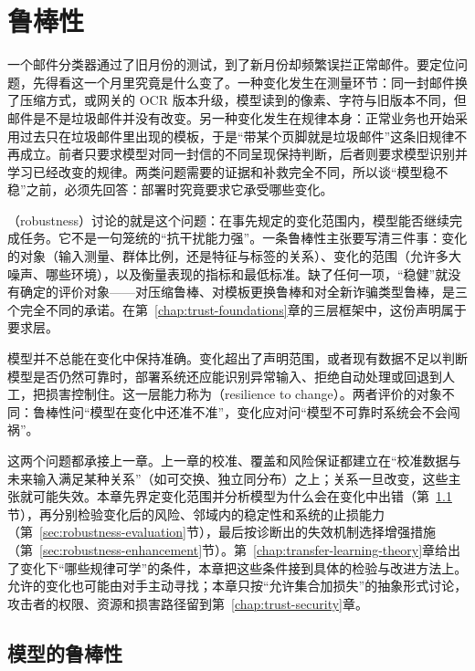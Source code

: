 \chapter{鲁棒性}
\label{chap:trust-robustness}

一个邮件分类器通过了旧月份的测试，到了新月份却频繁误拦正常邮件。要定位问题，先得看这一个月里究竟是什么变了。一种变化发生在测量环节：同一封邮件换了压缩方式，或网关的 OCR 版本升级，模型读到的像素、字符与旧版本不同，但邮件是不是垃圾邮件并没有改变。另一种变化发生在规律本身：正常业务也开始采用过去只在垃圾邮件里出现的模板，于是“带某个页脚就是垃圾邮件”这条旧规律不再成立。前者只要求模型对同一封信的不同呈现保持判断，后者则要求模型识别并学习已经改变的规律。两类问题需要的证据和补救完全不同，所以谈“模型稳不稳”之前，必须先回答：部署时究竟要求它承受哪些变化。

（robustness）讨论的就是这个问题：在事先规定的变化范围内，模型能否继续完成任务。它不是一句笼统的“抗干扰能力强”。一条鲁棒性主张要写清三件事：变化的对象（输入测量、群体比例，还是特征与标签的关系）、变化的范围（允许多大噪声、哪些环境），以及衡量表现的指标和最低标准。缺了任何一项，“稳健”就没有确定的评价对象——对压缩鲁棒、对模板更换鲁棒和对全新诈骗类型鲁棒，是三个完全不同的承诺。在第~\ref{chap:trust-foundations}章的三层框架中，这份声明属于要求层。

模型并不总能在变化中保持准确。变化超出了声明范围，或者现有数据不足以判断模型是否仍然可靠时，部署系统还应能识别异常输入、拒绝自动处理或回退到人工，把损害控制住。这一层能力称为（resilience to change）。两者评价的对象不同：鲁棒性问“模型在变化中还准不准”，变化应对问“模型不可靠时系统会不会闯祸”。

这两个问题都承接上一章。上一章的校准、覆盖和风险保证都建立在“校准数据与未来输入满足某种关系”（如可交换、独立同分布）之上；关系一旦改变，这些主张就可能失效。本章先界定变化范围并分析模型为什么会在变化中出错（第~\ref{sec:robustness-fragility}节），再分别检验变化后的风险、邻域内的稳定性和系统的止损能力（第~\ref{sec:robustness-evaluation}节），最后按诊断出的失效机制选择增强措施（第~\ref{sec:robustness-enhancement}节）。第~\ref{chap:transfer-learning-theory}章给出了变化下“哪些规律可学”的条件，本章把这些条件接到具体的检验与改进方法上。允许的变化也可能由对手主动寻找；本章只按“允许集合加损失”的抽象形式讨论，攻击者的权限、资源和损害路径留到第~\ref{chap:trust-security}章。

\section{模型的鲁棒性}
\label{sec:robustness-fragility}

